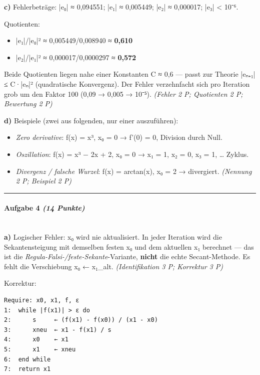 \documentclass[11pt, a4paper]{article}
\begin{document}
\textbf{c)} Fehlerbeträge: |e₀| ≈ 0,094551; |e₁| ≈ 0,005449; |e₂| ≈ 0,000017; |e₃| < 10⁻⁶.

Quotienten:

\begin{itemize}
  \item |e₁|/|e₀|² ≈ 0,005449/0,008940 ≈ \textbf{0,610}
  \item |e₂|/|e₁|² ≈ 0,000017/0,0000297 ≈ \textbf{0,572}
\end{itemize}

Beide Quotienten liegen nahe einer Konstanten C ≈ 0,6 — passt zur Theorie |eₙ₊₁| ≤ C·|eₙ|² (quadratische Konvergenz). Der Fehler verzehnfacht sich pro Iteration grob um den Faktor 100 (0,09 → 0,005 → 10⁻⁵). \textit{(Fehler 2 P; Quotienten 2 P; Bewertung 2 P)}


\textbf{d)} Beispiele (zwei aus folgenden, nur einer auszuführen):

\begin{itemize}
  \item \textit{Zero derivative}: f(x) = x³, x₀ = 0 → f'(0) = 0, Division durch Null.
  \item \textit{Oszillation}: f(x) = x³ − 2x + 2, x₀ = 0 → x₁ = 1, x₂ = 0, x₃ = 1, … Zyklus.
  \item \textit{Divergenz / falsche Wurzel}: f(x) = arctan(x), x₀ = 2 → divergiert. \textit{(Nennung 2 P; Beispiel 2 P)}
\end{itemize}


\noindent\textcolor{rulegray}{\rule{\linewidth}{0.4pt}}


\paragraph{Aufgabe 4 \textit{(14 Punkte)}}\mbox{}\\[2pt]

\textbf{a)} Logischer Fehler: x₀ wird nie aktualisiert. In jeder Iteration wird die Sekantensteigung mit demselben festen x₀ und dem aktuellen x₁ berechnet — das ist die \textit{Regula-Falsi-/feste-Sekante}-Variante, \textbf{nicht} die echte Secant-Methode. Es fehlt die Verschiebung x₀ ← x₁\_alt. \textit{(Identifikation 3 P; Korrektur 3 P)}


Korrektur:

\begin{lstlisting}
Require: x0, x1, f, ε
1:  while |f(x1)| > ε do
2:      s     ← (f(x1) - f(x0)) / (x1 - x0)
3:      xneu  ← x1 - f(x1) / s
4:      x0    ← x1
5:      x1    ← xneu
6:  end while
7:  return x1
\end{lstlisting}
\end{document}
